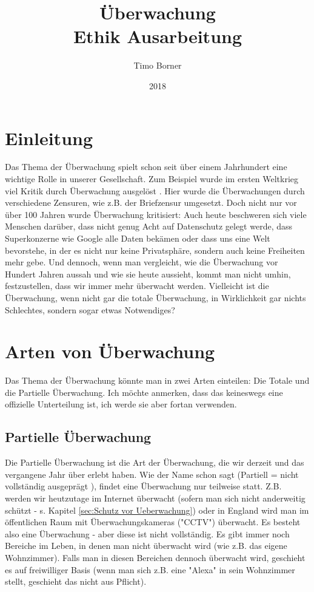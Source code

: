 \documentclass{article}
\title{Überwachung \\ Ethik Ausarbeitung}
\author{Timo Borner}
\date{2018}
\begin{document}
\maketitle
\newpage

\section{Einleitung}
Das Thema der Überwachung spielt schon seit über einem Jahrhundert eine wichtige Rolle in unserer Gesellschaft. Zum Beispiel wurde im ersten Weltkrieg viel Kritik durch Überwachung ausgelöst \autocite{Pressefreiheit}.
Hier wurde die Überwachungen durch verschiedene Zensuren, wie z.B. der Briefzensur \autocite{Zensur} umgesetzt. Doch nicht nur vor über 100 Jahren wurde Überwachung kritisiert: Auch heute beschweren sich viele Menschen darüber, dass nicht genug Acht auf Datenschutz gelegt werde, dass Superkonzerne wie Google alle Daten bekämen oder dass uns eine Welt bevorstehe, in der es nicht nur keine Privatsphäre, sondern auch keine Freiheiten mehr gebe. Und dennoch, wenn man vergleicht, wie die Überwachung vor Hundert Jahren aussah und wie sie heute aussieht, kommt man nicht umhin, festzustellen, dass wir immer mehr überwacht werden. Vielleicht ist die Überwachung, wenn nicht gar die totale Überwachung, in Wirklichkeit gar nichts Schlechtes, sondern sogar etwas Notwendiges?

\section{Arten von Überwachung}
Das Thema der Überwachung könnte man in zwei Arten einteilen: Die Totale und die Partielle Überwachung. Ich möchte anmerken, dass das keineswegs eine offizielle Unterteilung ist, ich werde sie aber fortan verwenden.

\subsection{Partielle Überwachung}
Die Partielle Überwachung ist die Art der Überwachung, die wir derzeit und das vergangene Jahr über erlebt haben. Wie der Name schon sagt (Partiell = nicht vollständig ausgeprägt \autocite{Partiell}), findet eine Überwachung nur teilweise statt. Z.B. werden wir heutzutage im Internet überwacht (sofern man sich nicht anderweitig schützt - s. Kapitel \ref{sec:Schutz vor Ueberwachung}) oder in England wird man im öffentlichen Raum mit Überwachungskameras ("CCTV") überwacht. Es besteht also eine Überwachung - aber diese ist nicht vollständig. Es gibt immer noch Bereiche im Leben, in denen man nicht überwacht wird (wie z.B. das eigene Wohnzimmer). Falls man in diesen Bereichen dennoch überwacht wird, geschieht es auf freiwilliger Basis (wenn man sich z.B. eine "Alexa" in sein Wohnzimmer stellt, geschieht das nicht aus Pflicht).
\end{document}
